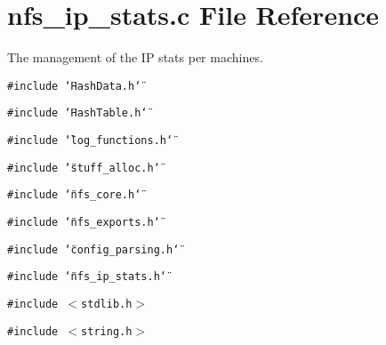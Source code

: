 \section{nfs\_\-ip\_\-stats.c File Reference}
\label{nfs__ip__stats_8c}
The management of the IP stats per machines. 

{\tt \#include \char`\"{}Hash\-Data.h\char`\"{}}\par
{\tt \#include \char`\"{}Hash\-Table.h\char`\"{}}\par
{\tt \#include \char`\"{}log\_\-functions.h\char`\"{}}\par
{\tt \#include \char`\"{}stuff\_\-alloc.h\char`\"{}}\par
{\tt \#include \char`\"{}nfs\_\-core.h\char`\"{}}\par
{\tt \#include \char`\"{}nfs\_\-exports.h\char`\"{}}\par
{\tt \#include \char`\"{}config\_\-parsing.h\char`\"{}}\par
{\tt \#include \char`\"{}nfs\_\-ip\_\-stats.h\char`\"{}}\par
{\tt \#include $<$stdlib.h$>$}\par
{\tt \#include $<$string.h$>$}\par
